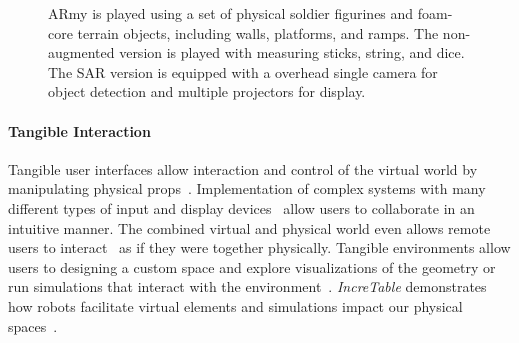 \documentclass[10pt,twocolumn,letterpaper]{article}
\begin{document}
\begin{figure}[t]
\caption{ARmy is played using a set of physical 
  soldier figurines and foam-core terrain objects, including walls,
  platforms, and ramps.  The non-augmented version is played with measuring sticks, string, and dice.  
The SAR version is equipped with a overhead
single camera for object detection and multiple projectors for
display.  
}
\vspace{-0.1in}
\label{FIGURE:props_and_contraption}
\end{figure}






\vspace{-0.1in}
\paragraph{Tangible Interaction}

Tangible user interfaces allow interaction and control of the virtual
world by manipulating physical
props~\cite{Fitzmaurice:1995:BLF:223904.223964}. 
Implementation of complex systems with many different types of input
and display devices~\cite{MacWilliams:2003:HSL:946248.946803} allow
users to collaborate in an intuitive manner.  The combined virtual and
physical world even allows remote users to
interact~\cite{Wilson_playtogether:playing} as if they were together
physically.
%
%
Tangible environments allow users to designing a custom space and
explore visualizations of the
geometry or run simulations that
interact with the environment~\cite{Ishii:2004:BCS:1031314.1031369,DBLP:conf/ismar/JonesSCGB10}.
%
{\em IncreTable} demonstrates how robots facilitate virtual elements
and simulations impact our physical
spaces~\cite{Leitner:2008:IMR:1501750.1501753}.
%
%
%
%
%
\end{document}
